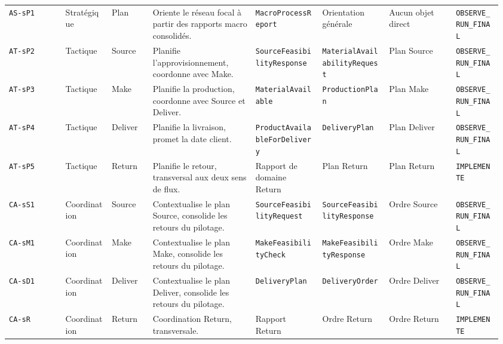 \begin{landscape}
{\begin{longtable}{L{0.11\linewidth} L{0.09\linewidth} L{0.08\linewidth} L{0.20\linewidth} L{0.13\linewidth} L{0.13\linewidth} L{0.13\linewidth} L{0.09\linewidth}}
\texttt{AS-s\allowbreak P1} & Stratégique & Plan & Oriente le réseau focal à partir des rapports macro consolidés. & \texttt{Macro\allowbreak Process\allowbreak Report} & Orientation générale & Aucun objet direct & \texttt{OBSERVE\_\allowbreak RUN\_\allowbreak FINAL} \\
\texttt{AT-s\allowbreak P2} & Tactique & Source & Planifie l'approvisionnement, coordonne avec Make. & \texttt{Source\allowbreak Feasibility\allowbreak Response} & \texttt{Material\allowbreak Availability\allowbreak Request} & Plan Source & \texttt{OBSERVE\_\allowbreak RUN\_\allowbreak FINAL} \\
\texttt{AT-s\allowbreak P3} & Tactique & Make & Planifie la production, coordonne avec Source et Deliver. & \texttt{Material\allowbreak Available} & \texttt{Production\allowbreak Plan} & Plan Make & \texttt{OBSERVE\_\allowbreak RUN\_\allowbreak FINAL} \\
\texttt{AT-s\allowbreak P4} & Tactique & Deliver & Planifie la livraison, promet la date client. & \texttt{Product\allowbreak Available\allowbreak For\allowbreak Delivery} & \texttt{Delivery\allowbreak Plan} & Plan Deliver & \texttt{OBSERVE\_\allowbreak RUN\_\allowbreak FINAL} \\
\texttt{AT-s\allowbreak P5} & Tactique & Return & Planifie le retour, transversal aux deux sens de flux. & Rapport de domaine Return & Plan Return & Plan Return & \texttt{IMPLEMENTE} \\
\texttt{CA-s\allowbreak S1} & Coordination & Source & Contextualise le plan Source, consolide les retours du pilotage. & \texttt{Source\allowbreak Feasibility\allowbreak Request} & \texttt{Source\allowbreak Feasibility\allowbreak Response} & Ordre Source & \texttt{OBSERVE\_\allowbreak RUN\_\allowbreak FINAL} \\
\texttt{CA-s\allowbreak M1} & Coordination & Make & Contextualise le plan Make, consolide les retours du pilotage. & \texttt{Make\allowbreak Feasibility\allowbreak Check} & \texttt{Make\allowbreak Feasibility\allowbreak Response} & Ordre Make & \texttt{OBSERVE\_\allowbreak RUN\_\allowbreak FINAL} \\
\texttt{CA-s\allowbreak D1} & Coordination & Deliver & Contextualise le plan Deliver, consolide les retours du pilotage. & \texttt{Delivery\allowbreak Plan} & \texttt{Delivery\allowbreak Order} & Ordre Deliver & \texttt{OBSERVE\_\allowbreak RUN\_\allowbreak FINAL} \\
\texttt{CA-s\allowbreak R} & Coordination & Return & Coordination Return, transversale. & Rapport Return & Ordre Return & Ordre Return & \texttt{IMPLEMENTE} \\

\end{longtable}}
\end{landscape}
